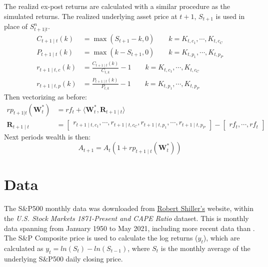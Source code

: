 The realizd ex-post returns are calculated with a similar procedure as the simulated returns. The realized underlying asset price at $t+1$, $S_{t+1}$ is used in place of $S_{t+1|t}^{n}$.
\noindent
\begin{align} 
\nonumber C_{t+1 \mid t}(k) &= \max (S_{t+1} - k, 0) \quad \quad k = K_{t, c_{1}}, \cdots, K_{t, c_{C}} 
\\ \nonumber P_{t+1 \mid t}(k) &= \max (k - S_{t+1}, 0) \quad \quad k = K_{t, p_{1}}, \cdots, K_{t, p_{P}}
\\ \nonumber r_{t+1 \mid t, c}(k) &= \frac{C_{t+1 \mid t}(k)}{C_{t, k}} - 1 \quad \quad k = K_{t, c_{1}}, \cdots, K_{t, c_{C}}
\\ \nonumber r_{t+1 \mid t, p}(k) &= \frac{P_{t+1 \mid t}(k)}{P_{t, k}} - 1 \quad \quad k = K_{t, p_{1}}, \cdots, K_{t, p_{P}}
\end{align}
\noindent
Then vectorizing as before:
\noindent
\begin{align}
\nonumber rp_{t+1|t}(\mathbf{W}_{t}^{*}) &= rf_{t} + \langle\mathbf{W}_{t}^{*}, \mathbf{R}_{t+1 \mid t}\rangle
\\ \nonumber \mathbf{R}_{t+1 \mid t} &= \begin{bmatrix} r_{t + 1 \mid t, c_{1}}, \dotsb, r_{t + 1 \mid t, c_{C}}, r_{t + 1 \mid t, p_{1}}, \dotsb, r_{t + 1 \mid t, p_{P}} \end{bmatrix} - \begin{bmatrix} rf_{t}, \dotsb, rf_{t} \end{bmatrix}
\end{align}
\noindent
Next periods wealth is then:
\noindent
\[A_{t+1} = A_{t} (1 + rp_{t+1 \mid t}(\mathbf{W}_{t}^{*}))\]


\section{Data}\label{sec:Data}

The S\&P500 monthly data was downloaded from \href{http://www.econ.yale.edu/~shiller/data.htm}{Robert Shiller's} website, within the \textit{U.S. Stock Markets 1871-Present and CAPE Ratio} dataset. This is monthly data spanning from January 1950 to May 2021, including more recent data than \cite{faias2017optimal}. The S\&P Composite price is used to calculate the log returns ($y_{t}$), which are calculated as $y_{t} = ln(S_{t}) - ln(S_{t - 1})$, where $S_{t}$ is the monthly average of the underlying S\&P500 daily closing price.

